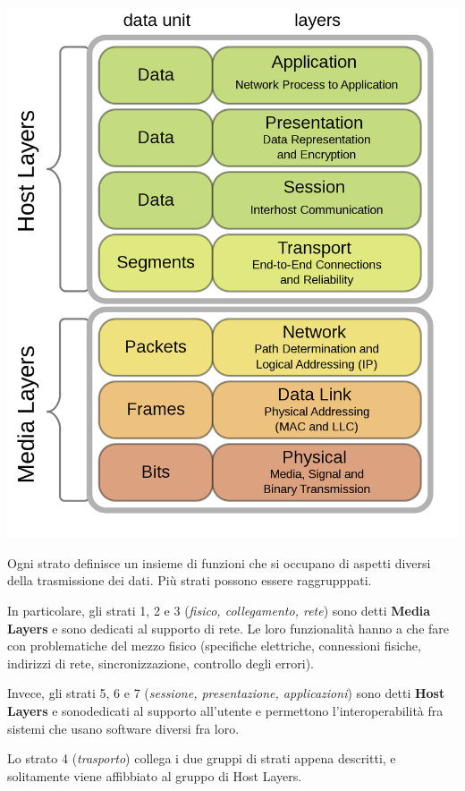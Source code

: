 \begin{center}
    \includegraphics[scale=0.25]{images/OSI.png}
\end{center}

Ogni strato definisce un insieme di funzioni che si occupano di aspetti diversi della trasmissione dei dati. Più strati possono essere raggrupppati.

In particolare, gli strati 1, 2 e 3 (\textit{fisico, collegamento, rete}) sono detti \textbf{Media Layers} e sono dedicati al supporto di rete. Le loro funzionalità hanno a che fare con problematiche del mezzo fisico (specifiche elettriche, connessioni fisiche, indirizzi di rete, sincronizzazione, controllo degli errori).

Invece, gli strati 5, 6 e 7 (\textit{sessione, presentazione, applicazioni}) sono detti \textbf{Host Layers} e sonodedicati al supporto all'utente e permettono l'interoperabilità fra sistemi che usano software diversi fra loro. 

Lo strato 4 (\textit{trasporto}) collega i due gruppi di strati appena descritti, e solitamente viene affibbiato al gruppo di Host Layers.

